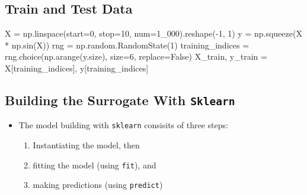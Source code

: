\documentclass[
  letterpaper,
  DIV=11,
  numbers=noendperiod]{scrreprt}
\newenvironment{Shaded}{\begin{snugshade}}{\end{snugshade}}
\newcommand{\DecValTok}[1]{\textcolor[rgb]{0.68,0.00,0.00}{#1}}
\newcommand{\NormalTok}[1]{\textcolor[rgb]{0.00,0.23,0.31}{#1}}
\newcommand{\OperatorTok}[1]{\textcolor[rgb]{0.37,0.37,0.37}{#1}}
\newcommand{\VariableTok}[1]{\textcolor[rgb]{0.07,0.07,0.07}{#1}}
\providecommand{\tightlist}{%
  \setlength{\itemsep}{0pt}\setlength{\parskip}{0pt}}\usepackage{longtable,booktabs,array}
\begin{document}
\hypertarget{train-and-test-data}{%
\subsection{Train and Test Data}\label{train-and-test-data}}

\begin{Shaded}
\begin{Highlighting}[]
\NormalTok{X }\OperatorTok{=}\NormalTok{ np.linspace(start}\OperatorTok{=}\DecValTok{0}\NormalTok{, stop}\OperatorTok{=}\DecValTok{10}\NormalTok{, num}\OperatorTok{=}\DecValTok{1\_000}\NormalTok{).reshape(}\OperatorTok{{-}}\DecValTok{1}\NormalTok{, }\DecValTok{1}\NormalTok{)}
\NormalTok{y }\OperatorTok{=}\NormalTok{ np.squeeze(X }\OperatorTok{*}\NormalTok{ np.sin(X))}
\NormalTok{rng }\OperatorTok{=}\NormalTok{ np.random.RandomState(}\DecValTok{1}\NormalTok{)}
\NormalTok{training\_indices }\OperatorTok{=}\NormalTok{ rng.choice(np.arange(y.size), size}\OperatorTok{=}\DecValTok{6}\NormalTok{, replace}\OperatorTok{=}\VariableTok{False}\NormalTok{)}
\NormalTok{X\_train, y\_train }\OperatorTok{=}\NormalTok{ X[training\_indices], y[training\_indices]}
\end{Highlighting}
\end{Shaded}

\hypertarget{building-the-surrogate-with-sklearn}{%
\subsection{\texorpdfstring{Building the Surrogate With
\texttt{Sklearn}}{Building the Surrogate With Sklearn}}\label{building-the-surrogate-with-sklearn}}

\begin{itemize}
\tightlist
\item
  The model building with \texttt{sklearn} consisits of three steps:

  \begin{enumerate}
  \def\labelenumi{\arabic{enumi}.}
  \tightlist
  \item
    Instantiating the model, then
  \item
    fitting the model (using \texttt{fit}), and
  \item
    making predictions (using \texttt{predict})
  \end{enumerate}
\end{itemize}
\end{document}
